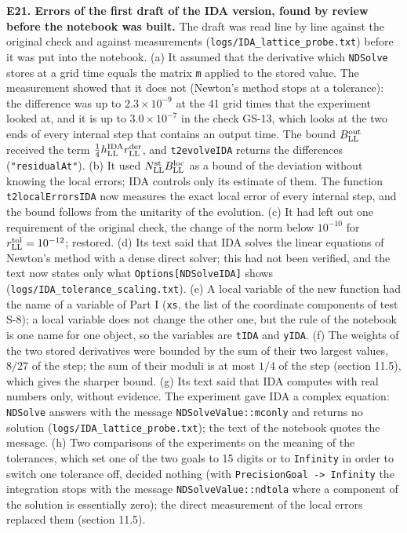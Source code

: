 \documentclass[
  10pt,
]{article}
\begin{document}
\textbf{E21. Errors of the first draft of the IDA version, found by
review before the notebook was built.} The draft was read line by line
against the original check and against measurements
(\texttt{logs/IDA\_lattice\_probe.txt}) before it was put into the
notebook. (a) It assumed that the derivative which \texttt{NDSolve}
stores at a grid time equals the matrix \texttt{m} applied to the stored
value. The measurement showed that it does not (Newton's method stops at
a tolerance): the difference was up to \(2.3\times10^{-9}\) at the 41
grid times that the experiment looked at, and it is up to
\(3.0\times10^{-7}\) in the check GS-13, which looks at the two ends of
every internal step that contains an output time. The bound
\(B^{\rm out}_{\rm LL}\) received the term
\(\tfrac14h^{\rm IDA}_{\rm LL}r^{\rm der}_{\rm LL}\), and
\texttt{t2evolveIDA} returns the differences (\texttt{"residualAt"}).
(b) It used \(N^{\rm st}_{\rm LL}B^{\rm loc}_{\rm LL}\) as a bound of
the deviation without knowing the local errors; IDA controls only its
estimate of them. The function \texttt{t2localErrorsIDA} now measures
the exact local error of every internal step, and the bound follows from
the unitarity of the evolution. (c) It had left out one requirement of
the original check, the change of the norm below \(10^{-10}\) for
\(r^{\rm tol}_{\rm LL}=10^{-12}\); restored. (d) Its text said that IDA
solves the linear equations of Newton's method with a dense direct
solver; this had not been verified, and the text now states only what
\texttt{Options{[}NDSolve\textasciigrave{}IDA{]}} shows
(\texttt{logs/IDA\_tolerance\_scaling.txt}). (e) A local variable of the
new function had the name of a variable of Part I (\texttt{xs}, the list
of the coordinate components of test S-8); a local variable does not
change the other one, but the rule of the notebook is one name for one
object, so the variables are \texttt{tIDA} and \texttt{yIDA}. (f) The
weights of the two stored derivatives were bounded by the sum of their
two largest values, \(8/27\) of the step; the sum of their moduli is at
most \(1/4\) of the step (section 11.5), which gives the sharper bound.
(g) Its text said that IDA computes with real numbers only, without
evidence. The experiment gave IDA a complex equation: \texttt{NDSolve}
answers with the message \texttt{NDSolveValue::mconly} and returns no
solution (\texttt{logs/IDA\_lattice\_probe.txt}); the text of the
notebook quotes the message. (h) Two comparisons of the experiments on
the meaning of the tolerances, which set one of the two goals to 15
digits or to \texttt{Infinity} in order to switch one tolerance off,
decided nothing (with \texttt{PrecisionGoal\ -\textgreater{}\ Infinity}
the integration stops with the message \texttt{NDSolveValue::ndtola}
where a component of the solution is essentially zero); the direct
measurement of the local errors replaced them (section 11.5).
\end{document}
